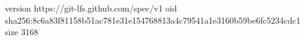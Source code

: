 version https://git-lfs.github.com/spec/v1
oid sha256:8c6a83f81158b51ac781e31e154768813a4c79541a1e3160b59be6fc5234cdc1
size 3168
